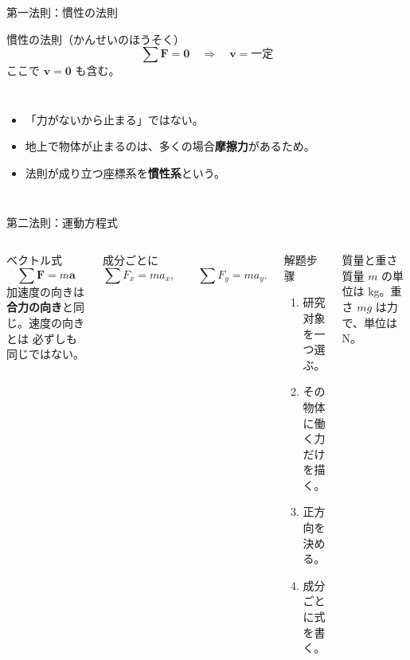 \documentclass[notheorems,aspectratio=169]{beamer}
\newcommand{\jp}[1]{\textbf{\color{JapanBlue}#1}}
\newcommand{\key}[1]{\textbf{\color{ChinaRed}#1}}
\newcommand{\vect}[1]{\bm{#1}}
\begin{document}
\begin{frame}{第一法則：慣性の法則}
  \begin{block}{慣性の法則（かんせいのほうそく）}
    \[
      \sum\vect F=\vect0
      \quad\Rightarrow\quad
      \vect v=\text{一定}
    \]
    ここで $\vect v=\vect0$ も含む。
  \end{block}

  \begin{columns}[T,onlytextwidth]
    \begin{itemize}
      \item 「力がないから止まる」ではない。
      \item 地上で物体が止まるのは、多くの場合\jp{摩擦力}があるため。
      \item 法則が成り立つ座標系を\jp{慣性系}という。
    \end{itemize}
    \centering
  \end{columns}
\end{frame}

\begin{frame}{第二法則：運動方程式}
  \begin{columns}[T,onlytextwidth]
    \begin{block}{ベクトル式}
      \[
        \boxed{\sum\vect F=m\vect a}
      \]
      加速度の向きは\key{合力の向き}と同じ。速度の向きとは
      必ずしも同じではない。
    \end{block}
    成分ごとに
    \[
      \sum F_x=ma_x,\qquad
      \sum F_y=ma_y.
    \]

    \begin{block}{解题步骤}
      \begin{enumerate}
        \item 研究对象を一つ選ぶ。
        \item その物体に働く力だけを描く。
        \item 正方向を決める。
        \item 成分ごとに式を書く。
      \end{enumerate}
    \end{block}
    \begin{alertblock}{質量と重さ}
      質量 $m$ の単位は kg。重さ $mg$ は力で、単位は N。
    \end{alertblock}
  \end{columns}
\end{frame}
\end{document}
